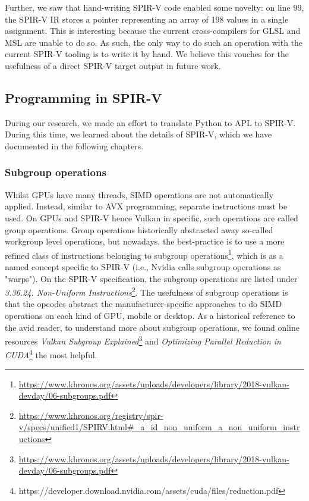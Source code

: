 \documentclass{IEEEtran}
\begin{document}
Further, we saw that hand-writing SPIR-V code enabled some novelty: on line 99, the SPIR-V IR stores a pointer representing an array of 198 values in a single assignment. This is interesting because the current cross-compilers for \gls{GLSL} and \gls{MSL} are unable to do so. As such, the only way to do such an operation with the current SPIR-V tooling is to write it by hand. We believe this vouches for the usefulness of a direct SPIR-V target output in future work.

\subsection{Programming in SPIR-V}
\label{ch:prgspirv}

During our research, we made an effort to translate Python to APL to SPIR-V. During this time, we learned about the details of SPIR-V, which we have documented in the following chapters.

\subsubsection{Subgroup operations}
\label{ch:vso}

Whilst GPUs have many threads, SIMD operations are not automatically applied. Instead, similar to AVX programming, separate instructions must be used. On GPUs and SPIR-V hence Vulkan in specific, such operations are called group operations. Group operations historically abstracted away so-called workgroup level operations, but nowadays, the best-practice is to use a more refined class of instructions belonging to subgroup operations\footnote{\url{https://www.khronos.org/assets/uploads/developers/library/2018-vulkan-devday/06-subgroups.pdf}}, which is as a named concept specific to SPIR-V (i.e., Nvidia calls subgroup operations as "warps"). On the SPIR-V specification, the subgroup operations are listed under \textit{3.36.24. Non-Uniform Instructions}\footnote{\url{https://www.khronos.org/registry/spir-v/specs/unified1/SPIRV.html#_a_id_non_uniform_a_non_uniform_instructions}}. The usefulness of subgroup operations is that the opcodes abstract the manufacturer-specific approaches to do SIMD operations on each kind of GPU, mobile or desktop. As a historical reference to the avid reader, to understand more about subgroup operations, we found online resources \textit{Vulkan Subgroup Explained}\footnote{\url{https://www.khronos.org/assets/uploads/developers/library/2018-vulkan-devday/06-subgroups.pdf}} and \textit{Optimizing Parallel Reduction in CUDA}\footnote{https://developer.download.nvidia.com/assets/cuda/files/reduction.pdf} the most helpful.
\end{document}
